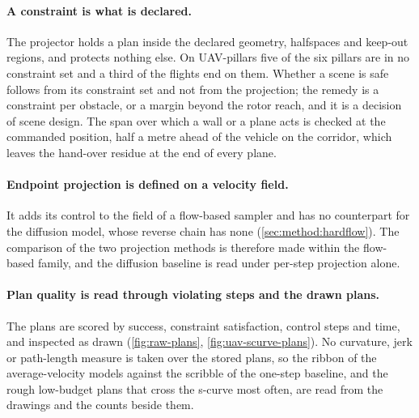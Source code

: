 \paragraph{A constraint is what is declared.} The projector holds a plan inside the declared geometry,
halfspaces and keep-out regions, and protects nothing else. On UAV-pillars five of the six pillars are
in no constraint set and a third of the flights end on them. Whether a scene is safe follows from its
constraint set and not from the projection; the remedy is a constraint per obstacle, or a margin beyond
the rotor reach, and it is a decision of scene design. The span over which a wall or a plane acts is
checked at the commanded position, half a metre ahead of the vehicle on the corridor, which leaves the
hand-over residue at the end of every plane.

\paragraph{Endpoint projection is defined on a velocity field.} It adds its control to the field of a
flow-based sampler and has no counterpart for the diffusion model, whose reverse chain has none
(\autoref{sec:method:hardflow}). The comparison of the two projection methods is therefore made within
the flow-based family, and the diffusion baseline is read under per-step projection alone.

\paragraph{Plan quality is read through violating steps and the drawn plans.} The plans are scored by
success, constraint satisfaction, control steps and time, and inspected as drawn (\autoref{fig:raw-plans},
\autoref{fig:uav-scurve-plans}). No curvature, jerk or path-length measure is taken over the stored
plans, so the ribbon of the average-velocity models against the scribble of the one-step baseline, and
the rough low-budget plans that cross the s-curve most often, are read from the drawings and the counts
beside them.

